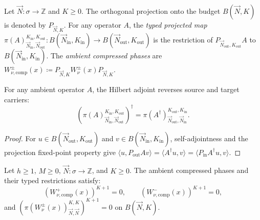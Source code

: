 \begin{definition}
\label{def:budget_projection_maps}
Let $\vec{N} : \sigma \to \mathbb{Z}$ and $K \ge 0$.
The orthogonal projection onto the budget $B(\vec{N}, K)$ is denoted by $P_{\vec{N}, K}$.
For any operator $A$, the \emph{typed projected map} $\pi(A)_{\vec{N}_{\mathrm{in}}, \vec{N}_{\mathrm{out}}}^{K_{\mathrm{in}}, K_{\mathrm{out}}} : B(\vec{N}_{\mathrm{in}}, K_{\mathrm{in}}) \to B(\vec{N}_{\mathrm{out}}, K_{\mathrm{out}})$ is the restriction of $P_{\vec{N}_{\mathrm{out}}, K_{\mathrm{out}}} A$ to $B(\vec{N}_{\mathrm{in}}, K_{\mathrm{in}})$.
The \emph{ambient compressed phases} are $W^\pm_{\nu, \mathrm{comp}}(x) \coloneqq P_{\vec{N}, K} W^\pm_\nu(x) P_{\vec{N}, K}$.
\end{definition}

\begin{lemma}
\label{lem:projected_map_adjoint}
For any ambient operator $A$, the Hilbert adjoint reverses source and target carriers:
\begin{equation}
\left( \pi(A)_{\vec{N}_{\mathrm{in}}, \vec{N}_{\mathrm{out}}}^{K_{\mathrm{in}}, K_{\mathrm{out}}} \right)^\dagger = \pi(A^\dagger)_{\vec{N}_{\mathrm{out}}, \vec{N}_{\mathrm{in}}}^{K_{\mathrm{out}}, K_{\mathrm{in}}}.
\end{equation}
\end{lemma}

\begin{proof}
For $u \in B(\vec{N}_{\mathrm{out}}, K_{\mathrm{out}})$ and $v \in B(\vec{N}_{\mathrm{in}}, K_{\mathrm{in}})$, self-adjointness and the projection fixed-point property give $\langle u, P_{\mathrm{out}} A v \rangle = \langle A^\dagger u, v \rangle = \langle P_{\mathrm{in}} A^\dagger u, v \rangle$.
\end{proof}

\begin{theorem}
\label{thm:compressed_nilpotency}
Let $h \ge 1$, $M \ge 0$, $\vec{N} : \sigma \to \mathbb{Z}$, and $K \ge 0$.
The ambient compressed phases and their typed restrictions satisfy:
\begin{equation}
\left( W^+_{\nu, \mathrm{comp}}(x) \right)^{K+1} = 0, \qquad \left( W^-_{\nu, \mathrm{comp}}(x) \right)^{K+1} = 0,
\end{equation}
and $\left( \pi(W^\pm_\nu(x))_{\vec{N}, \vec{N}}^{K, K} \right)^{K+1} = 0$ on $B(\vec{N}, K)$.
\end{theorem}

